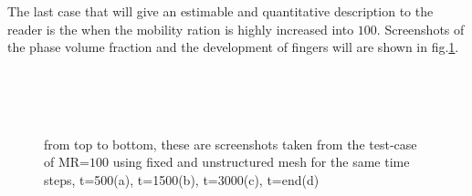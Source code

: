 \documentclass[preprint,authoryear,12pt]{elsarticle}
\begin{document}
The last case that will give an estimable and quantitative description to the reader is the when the mobility ration is highly increased into $100$. Screenshots of the phase volume fraction and the development of fingers will are shown in fig.\ref{fig:4testcase}.

\begin{figure}
\centering
{}\\[2mm]%
\\[2mm]%
\\[2mm]%
%
\caption{from top to bottom, these are screenshots taken from the test-case of MR=$100$ using fixed and unstructured mesh for the same time steps, t=500(a), t=1500(b), t=3000(c), t=end(d)}
\label{fig:4testcase}
\end{figure}
\end{document}
